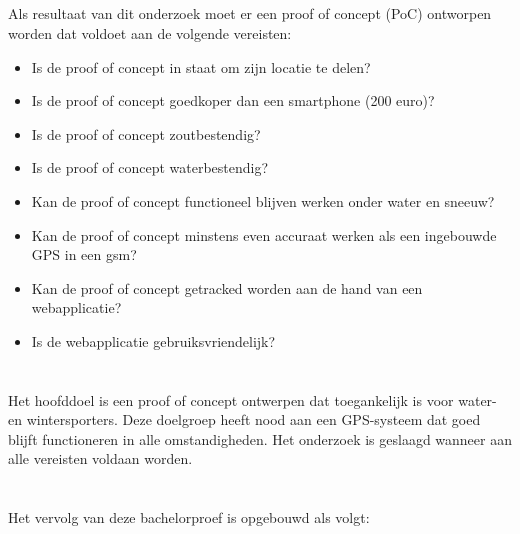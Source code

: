 \subsection{}
Als resultaat van dit onderzoek moet er een proof of concept (PoC) ontworpen worden dat voldoet aan de volgende vereisten:
\begin{itemize}
	\item Is de proof of concept in staat om zijn locatie te delen?
	\item Is de proof of concept goedkoper dan een smartphone (200 euro)?
	\item Is de proof of concept zoutbestendig?
	\item  Is de proof of concept waterbestendig?
    \item Kan de proof of concept functioneel blijven werken  onder water en sneeuw?
	\item Kan de proof of concept minstens even accuraat werken als een ingebouwde GPS in een gsm?
	\item Kan de proof of concept getracked worden aan de hand van een webapplicatie?
	\item Is de webapplicatie gebruiksvriendelijk?
\end{itemize}

\section{}
\label{sec:onderzoeksdoelstelling}
Het hoofddoel is een proof of concept ontwerpen dat toegankelijk is voor water- en wintersporters. Deze doelgroep heeft nood aan een GPS-systeem dat goed blijft functioneren in alle omstandigheden. Het onderzoek is geslaagd wanneer aan alle vereisten voldaan worden.


\section{}
\label{sec:opzet-bachelorproef}


Het vervolg van deze bachelorproef is opgebouwd als volgt:

